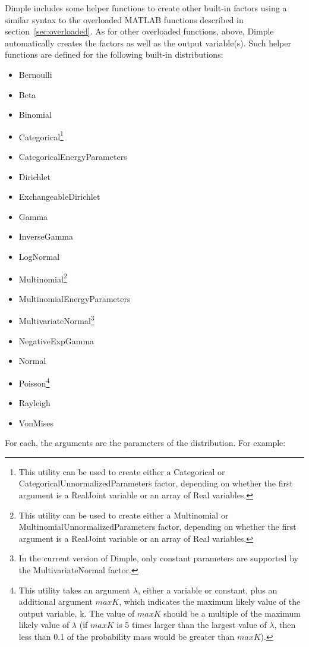 Dimple includes some helper functions to create other built-in factors using a similar syntax to the overloaded MATLAB functions described in section~\ref{sec:overloaded}.  As for other overloaded functions, above, Dimple automatically creates the factors as well as the output variable(s).  Such helper functions are defined for the following built-in distributions:

\begin{itemize}
\item Bernoulli
\item Beta
\item Binomial
\item Categorical\footnote{This utility can be used to create either a Categorical or CategoricalUnnormalizedParameters factor, depending on whether the first argument is a RealJoint variable or an array of Real variables.}
\item CategoricalEnergyParameters
\item Dirichlet
\item ExchangeableDirichlet
\item Gamma
\item InverseGamma
\item LogNormal
\item Multinomial\footnote{This utility can be used to create either a Multinomial or MultinomialUnnormalizedParameters factor, depending on whether the first argument is a RealJoint variable or an array of Real variables.}
\item MultinomialEnergyParameters
\item MultivariateNormal\footnote{In the current version of Dimple, only constant parameters are supported by the MultivariateNormal factor.}
\item NegativeExpGamma
\item Normal
\item Poisson\footnote{This utility takes an argument $\lambda$, either a variable or constant, plus an additional argument $maxK$, which indicates the maximum likely value of the output variable, k.  The value of $maxK$ should be a multiple of the maximum likely value of $\lambda$ (if $maxK$ is 5 times larger than the largest value of $\lambda$, then less than 0.1 of the probability mass would be greater than $maxK$).}
\item Rayleigh
\item VonMises
\end{itemize}

For each, the arguments are the parameters of the distribution.  For example:


